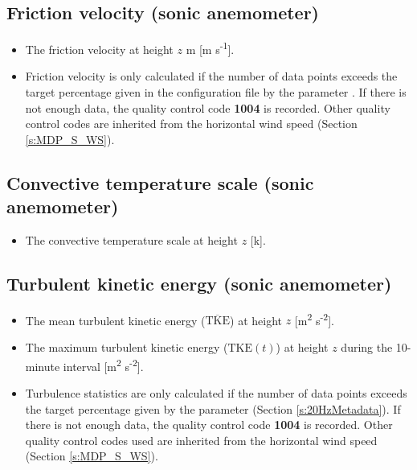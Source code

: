 \subsection{Friction velocity (sonic anemometer)} 
\begin{itemize}
\item {} The friction velocity at height $z$ m [m s\textsuperscript{-1}].
\item {} Friction velocity is only calculated if the number of data points exceeds the target percentage given in the configuration file by the parameter . If there is not enough data, the quality control code \textbf{1004} is recorded. Other quality control codes are inherited from the horizontal wind speed (Section \ref{s:MDP_S_WS}).
\end{itemize}

\subsection{Convective temperature scale (sonic anemometer)}  
\begin{itemize}
\item {} The convective temperature scale at height $z$ [k].
\end{itemize}

\subsection{Turbulent kinetic energy (sonic anemometer)} 
\begin{itemize}
\item {} The mean turbulent kinetic energy ($\overline{\textrm{TKE}}$) at height $z$ [m\textsuperscript{2} s\textsuperscript{-2}]. 
\item {} The maximum turbulent kinetic energy ($\textrm{TKE}(t)$) at height $z$ during the 10-minute interval [m\textsuperscript{2} s\textsuperscript{-2}].
\item {} Turbulence statistics are only calculated if the number of data points exceeds the target percentage given by the parameter  (Section \ref{s:20HzMetadata}). If there is not enough data, the quality control code \textbf{1004} is recorded. Other quality control codes used are inherited from the horizontal wind speed (Section \ref{s:MDP_S_WS}).
\end{itemize}

